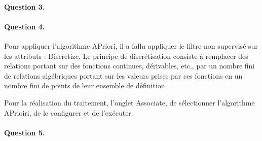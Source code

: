 \documentclass[a4paper,11pt]{article}
\begin{document}
\paragraph{Question 3.}

\paragraph{Question 4.}
    Pour appliquer l'algorithme \og{}APriori\fg{}, il a fallu appliquer le filtre non supervisé sur les attributs : \og{}Discretize\fg{}. Le principe de discrétisation consiste à remplacer des relations portant sur des fonctions continues, dérivables, etc., par un nombre fini de relations algébriques portant sur les valeurs prises par ces fonctions en un nombre fini de points de leur ensemble de définition.
    
    Pour la réalisation du traitement, l'onglet \og{}Associate\fg{}, de sélectionner  l'algorithme APrioiri, de le configurer et de l'exécuter.

\paragraph{Question 5.}



				
		
\end{document}
